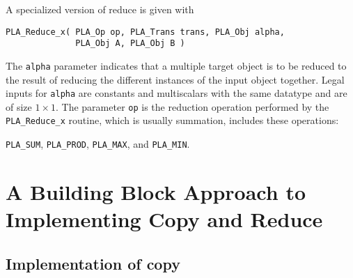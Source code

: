 A specialized version of reduce is given with
\begin{FlaSpec}
\begin{verbatim}
PLA_Reduce_x( PLA_Op op, PLA_Trans trans, PLA_Obj alpha,
              PLA_Obj A, PLA_Obj B )
\end{verbatim}
\end{FlaSpec}
The {\tt alpha} parameter indicates that a multiple target object is to be
reduced to the result of reducing the different instances of the input object
together.  Legal inputs for {\tt alpha} are constants and multiscalars with
the same datatype and are of size $1 \times 1$.
The parameter {\tt op} is the reduction operation performed by 
the {\tt PLA\_Reduce\_x} routine, which is usually summation, includes
these operations:  
\begin{center}
{\tt PLA\_SUM}, {\tt PLA\_PROD}, {\tt PLA\_MAX}, and {\tt PLA\_MIN}.
\end{center}







\section{A Building Block Approach to Implementing Copy and Reduce}


\subsection{Implementation of copy}


